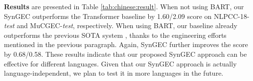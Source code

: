 \documentclass[11pt]{article}
\begin{document}
\begin{table}[tp!]
\centering
{}
\caption{Single-model results on Chinese datasets. }
\label{tab:chinese:result}
\end{table} 
\textbf{Results} are presented in Table \ref{tab:chinese:result}. When not using BART, our SynGEC outperforms the Transformer baseline by  1.60/2.09  score on NLPCC-18-\textit{test} and MuCGEC-\textit{test}, respectively. When using BART, our baseline already outperforms the previous SOTA system \citep{zhang2022mucgec}, thanks to the engineering efforts mentioned in the previous paragraph. Again, SynGEC further improves the  score by 0.68/0.58. These results indicate that our proposed SynGEC approach can be effective for different languages. Given that our SynGEC approach is actually language-independent, we plan to test it in more languages in the future.
\end{document}

